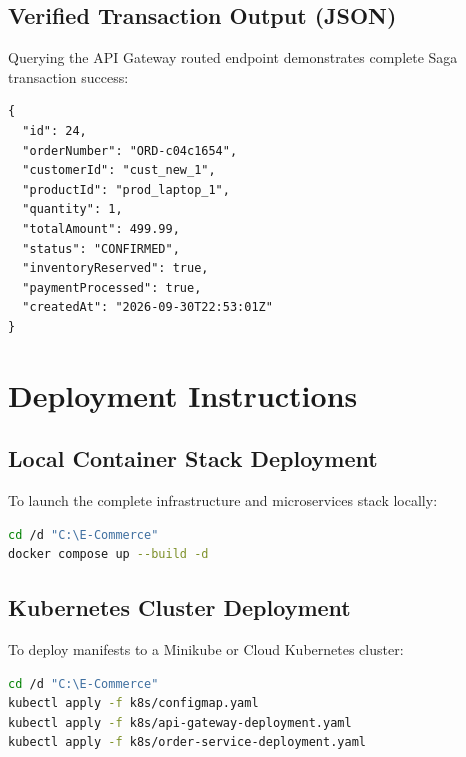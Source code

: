 \documentclass[11pt,a4paper]{article}
\begin{document}
\subsection{Verified Transaction Output (JSON)}
Querying the API Gateway routed endpoint demonstrates complete Saga transaction success:

\begin{lstlisting}[caption=API Gateway Response: GET http://localhost:8085/api/v1/orders/ORD-c04c1654]
{
  "id": 24,
  "orderNumber": "ORD-c04c1654",
  "customerId": "cust_new_1",
  "productId": "prod_laptop_1",
  "quantity": 1,
  "totalAmount": 499.99,
  "status": "CONFIRMED",
  "inventoryReserved": true,
  "paymentProcessed": true,
  "createdAt": "2026-09-30T22:53:01Z"
}
\end{lstlisting}

\vspace{0.3cm}

\section{Deployment Instructions}

\subsection{Local Container Stack Deployment}
To launch the complete infrastructure and microservices stack locally:
\begin{lstlisting}[language=bash, caption=Docker Compose Deployment Command]
cd /d "C:\E-Commerce"
docker compose up --build -d
\end{lstlisting}

\subsection{Kubernetes Cluster Deployment}
To deploy manifests to a Minikube or Cloud Kubernetes cluster:
\begin{lstlisting}[language=bash, caption=Kubernetes Apply Commands]
cd /d "C:\E-Commerce"
kubectl apply -f k8s/configmap.yaml
kubectl apply -f k8s/api-gateway-deployment.yaml
kubectl apply -f k8s/order-service-deployment.yaml
\end{lstlisting}

\vspace{0.5cm}

\end{document}
